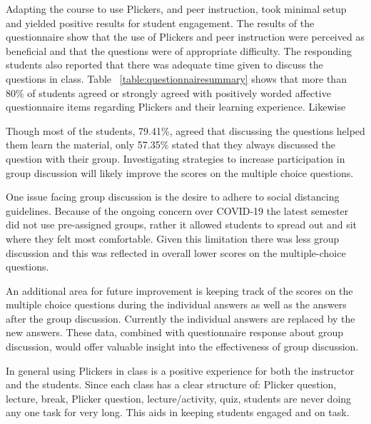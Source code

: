 \documentclass{article}
\begin{document}
Adapting the course to use Plickers, and peer instruction, took minimal setup and yielded positive results for student engagement. The results of the questionnaire show that the use of Plickers and peer instruction were perceived as beneficial and that the questions were of appropriate difficulty. The responding students also reported that there was adequate time given to discuss the questions in class. Table ~\ref{table:questionnairesummary} shows that more than 80\% of students agreed or strongly agreed with positively worded affective questionnaire items regarding Plickers and their learning experience. Likewise 

Though most of the students, 79.41\%, agreed that discussing the questions helped them learn the material, only 57.35\% stated that they always discussed the question with their group. Investigating strategies to increase participation in group discussion will likely improve the scores on the multiple choice questions.

One issue facing group discussion is the desire to adhere to social distancing guidelines. Because of the ongoing concern over COVID-19 the latest semester did not use pre-assigned groups, rather it allowed students to spread out and sit where they felt most comfortable. Given this limitation there was less group discussion and this was reflected in overall lower scores on the multiple-choice questions. 

An additional area for future improvement is keeping track of the scores on the multiple choice questions during the individual answers as well as the answers after the group discussion. Currently the individual answers are replaced by the new answers. These data, combined with questionnaire response about group discussion, would offer valuable insight into the effectiveness of group discussion.

In general using Plickers in class is a positive experience for both the instructor and the students. Since each class has a clear structure of: Plicker question, lecture, break, Plicker question, lecture/activity, quiz, students are never doing any one task for very long. This aids in keeping students engaged and on task.

\medskip

\printbibliography
\end{document}
